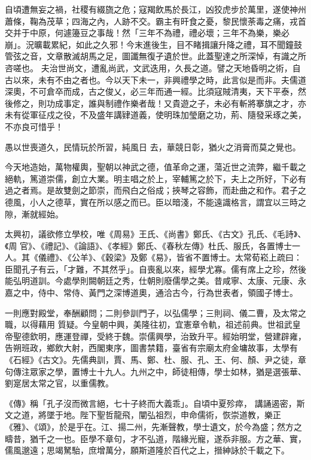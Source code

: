 \begin{pinyinscope}
 自頃遭無妄之禍，社稷有綴旒之危；寇羯飲馬於長江，凶狡虎步於萬里，遂使神州蕭條，鞠為茂草；四海之內，人跡不交。霸主有旰食之憂，黎民懷荼毒之痛，戎首交并于中原，何遽籩豆之事哉！然「三年不為禮，禮必壞；三年不為樂，樂必崩」。況曠載累紀，如此之久邪！今末進後生，目不睹揖讓升降之禮，耳不聞鐘鼓管弦之音，文章散滅胡馬之足，圖讖無復孑遺於世。此蓋聖達之所深悼，有識之所咨嗟也。
 夫治世尚文，遭亂尚武，文武迭用，久長之道。譬之天地昏明之術，自古以來，未有不由之者也。今以天下未一，非興禮學之時，此言似是而非。夫儒道深奧，不可倉卒而成，古之俊乂，必三年而通一經。比須寇賊清夷，天下平泰，然後修之，則功成事定，誰與制禮作樂者哉！又貴遊之子，未必有斬將搴旗之才，亦未有從軍征戍之役，不及盛年講肄道義，使明珠加瑩磨之功，荊、隨發采琢之美，不亦良可惜乎！



 愚以世喪道久，民情玩於所習，純風日
 去，華競日彰，猶火之消膏而莫之覺也。



 今天地造始，萬物權輿，聖朝以神武之德，值革命之運，蕩近世之流弊，繼千載之絕軌，篤道崇儒，創立大業。明主唱之於上，宰輔篤之於下，夫上之所好，下必有過之者焉。是故雙劍之節崇，而飛白之俗成；挾琴之容飾，而赴曲之和作。君子之德風，小人之德草，實在所以感之而已。臣以暗淺，不能遠識格言，謂宜以三時之隙，漸就經始。



 太興初，議欲修立學校，唯《周易》王氏、《尚書》鄭氏、《古文》孔氏、《毛詩》、《周
 官》、《禮記》、《論語》、《孝經》鄭氏、《春秋左傳》杜氏、服氏，各置博士一人。其《儀禮》、《公羊》、《穀梁》及鄭《易》，皆省不置博士。太常荀崧上疏曰：臣聞孔子有云，「才難，不其然乎」。自喪亂以來，經學尤寡。儒有席上之珍，然後能弘明道訓。今處學則闕朝廷之秀，仕朝則廢儒學之美。昔咸寧、太康、元康、永嘉之中，侍中、常侍、黃門之深博道奧，通洽古今，行為世表者，領國子博士。



 一則應對殿堂，奉酬顧問；二則參訓門子，以弘儒學；三則祠、儀二曹，及太常之職，以得藉用
 質疑。今皇朝中興，美隆往初，宜憲章令軌，祖述前典。世祖武皇帝聖德欽明，應運登禪，受終于魏。崇儒興學，治致升平。經始明堂，營建辟雍，告朔班政，鄉飲大射，西閣東序，圖書禁籍，臺省有宗廟太府金墉故事，太學有《石經》《古文》。先儒典訓，賈、馬、鄭、杜、服、孔、王、何、顏、尹之徒，章句傳注眾家之學，置博士十九人。九州之中，師徒相傳，學士如林，猶是選張華、劉寔居太常之官，以重儒教。



 《傳》稱「孔子沒而微言絕，七十子終而大義乖」。自頃中夏殄瘁，
 講誦遏密，斯文之道，將墜于地。陛下聖哲龍飛，闡弘祖烈，申命儒術，恢崇道教，樂正《雅》、《頌》，於是乎在。江、揚二州，先漸聲教，學士遺文，於今為盛；然方之疇昔，猶千之一也。臣學不章句，才不弘道，階緣光寵，遂忝非服。方之華、實，儒風邈遠；思竭駑駘，庶增萬分，願斯道隆於百代之上，搢紳詠於千載之下。




\end{pinyinscope}
